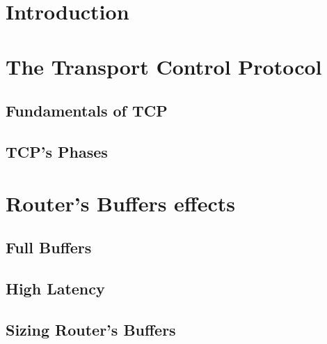 \documentclass[letter, 11pt]{article}
\theoremstyle{plain}
\theoremstyle{definition}
\begin{document}




\newpage
\printglossary

\newpage
\tableofcontents
\listoffigures
\listoftables

\newpage

\doublespacing
\section{Introduction}


\newpage

%
\section{The Transport Control Protocol}


\subsection{Fundamentals of TCP}


\subsection{TCP's Phases }


\newpage

\section{Router's Buffers effects}

\subsection{Full Buffers}

\subsection{High Latency}

\subsection{Sizing Router's Buffers}

\end{document}

